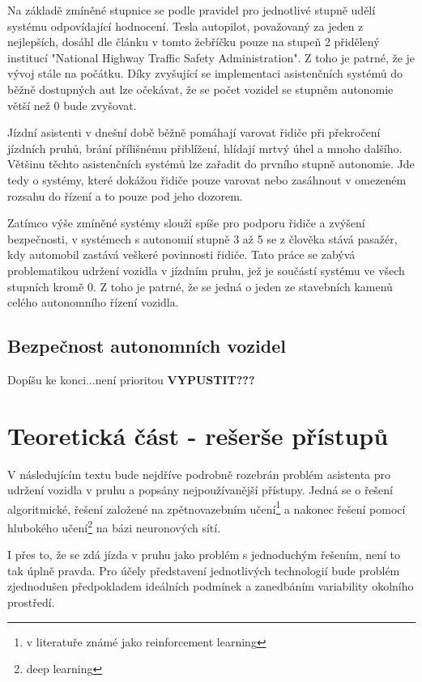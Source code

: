 \documentclass[czech, bc, kky, he, iso690numb]{fasthesis}
\begin{document}
       	Na základě zmíněné stupnice se podle pravidel pro jednotlivé stupně udělí systému odpovídající hodnocení. Tesla autopilot, považovaný za jeden z nejlepších, dosáhl dle článku \cite{autopilot} v tomto žebříčku pouze na stupeň 2 přidělený institucí "National Highway Traffic Safety Administration". Z toho je patrné, že je vývoj stále na počátku. Díky zvyšující se implementaci asistenčních systémů do běžně dostupných aut lze očekávat, že se počet vozidel se stupněm autonomie větší než 0 bude zvyšovat.         
        
        Jízdní asistenti v dnešní době běžně pomáhají varovat řidiče při překročení jízdních pruhů, brání přílišnému přiblížení, hlídají mrtvý úhel a mnoho dalšího. Většinu těchto asistenčních systémů lze zařadit do prvního stupně autonomie. Jde tedy o systémy, které dokážou řidiče pouze varovat nebo zasáhnout v omezeném rozsahu do řízení a to pouze pod jeho dozorem.
        
        Zatímco výše zmíněné systémy slouží spíše pro podporu řidiče a zvýšení bezpečnosti, v systémech s autonomií stupně 3 až 5 se z člověka stává pasažér, kdy automobil zastává veškeré povinnosti řidiče. Tato práce se zabývá problematikou udržení vozidla v jízdním pruhu, jež je součástí systému ve všech stupních kromě 0. Z toho je patrné, že se jedná o jeden ze stavebních kamenů celého autonomního řízení vozidla.\\
    \section{Bezpečnost autonomních vozidel}
    	Dopíšu ke konci...není prioritou \textbf{VYPUSTIT???}
    \chapter{Teoretická část - rešerše přístupů}\label{chap:01_asisten_jizdy_v_pruhu}
	    V následujícím textu bude nejdříve podrobně rozebrán problém asistenta pro udržení vozidla v pruhu a popsány nejpoužívanější přístupy. Jedná se o řešení algoritmické, řešení založené na zpětnovazebním učení\footnote{v literatuře známé jako reinforcement learning} a nakonec řešení pomocí hlubokého učení\footnote{deep learning} na bázi neuronových sítí.
	    
        I přes to, že se zdá jízda v pruhu jako problém s jednoduchým řešením, není to tak úplně pravda. Pro účely představení jednotlivých technologií bude problém zjednodušen předpokladem ideálních podmínek a zanedbáním variability okolního prostředí.
        
\end{document}
